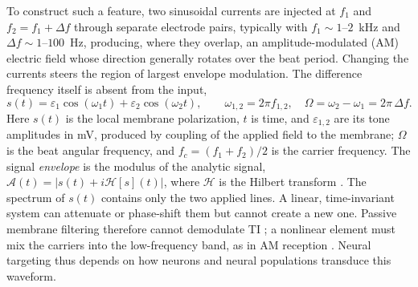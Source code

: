 To construct such a feature, two sinusoidal currents are injected at $f_1$ and
$f_2=f_1+\Delta f$ through separate electrode pairs, typically with $f_1\sim1$--$2$~kHz
and $\Delta f\sim1$--$100$~Hz, producing, where they overlap, an amplitude-modulated (AM)
electric field whose direction generally rotates over the beat period. Changing the
currents steers the region of largest envelope modulation. The difference frequency
itself is absent from the input,
\begin{equation}
s(t)=\varepsilon_1\cos(\omega_1 t)+\varepsilon_2\cos(\omega_2 t),\qquad
\omega_{1,2}=2\pi f_{1,2},\quad \Omega=\omega_2-\omega_1=2\pi\,\Delta f .
\label{eq:am}
\end{equation}
Here $s(t)$ is the local membrane polarization, $t$ is time, and
$\varepsilon_{1,2}$ are its tone amplitudes in mV, produced by coupling of the applied
field to the membrane; $\Omega$ is the beat angular frequency, and
$f_c=(f_1+f_2)/2$ is the carrier frequency. The signal \textit{envelope} is the modulus
of the analytic signal, $\mathcal A(t)=|s(t)+i\mathcal H[s](t)|$, where $\mathcal H$ is
the Hilbert transform \cite{gabor1946}. The spectrum of $s(t)$ contains only the two
applied lines. A linear, time-invariant system can attenuate or phase-shift them but
cannot create a new one. Passive membrane filtering therefore cannot demodulate TI
\cite{mirzakhalili2020}; a nonlinear element must mix the carriers into the
low-frequency band, as in AM reception \cite{nahin2001}. Neural targeting thus depends
on how neurons and neural populations transduce this waveform.

